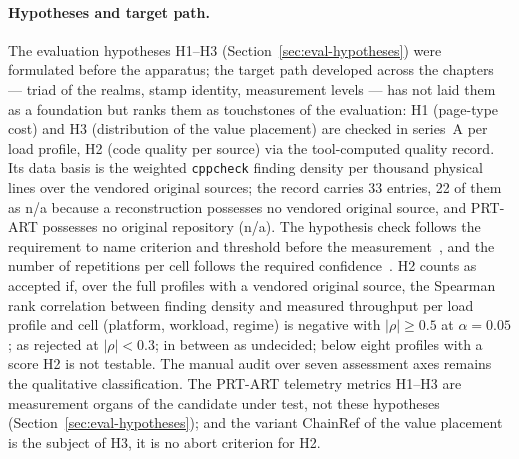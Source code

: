 \begin{nurlang}
\paragraph{Hypotheses and target path.} The evaluation hypotheses H1--H3
(Section~\ref{sec:eval-hypotheses}) were formulated before the apparatus; the target path developed
across the chapters --- triad of the realms, stamp identity, measurement levels --- has not laid
them as a foundation but ranks them as touchstones of the evaluation: H1 (page-type cost) and H3
(distribution of the value placement) are checked in series~A per load profile, H2 (code quality
per source) via the tool-computed quality record. Its data basis is the weighted
\texttt{cppcheck} finding density per thousand physical lines over the vendored original sources;
the record carries 33 entries, 22 of them as n/a because a reconstruction possesses no vendored
original source, and PRT-ART possesses no original repository (n/a). The hypothesis check follows
the requirement to name criterion and threshold before the measurement~\cite{wohlin2012experimentation},
and the number of repetitions per cell follows the required confidence~\cite{kalibera2013rigorous}.
H2 counts as accepted if, over the full profiles with a vendored original source, the Spearman rank
correlation between finding density and measured throughput per load profile and cell (platform,
workload, regime) is negative with $|\rho| \geq 0.5$ at $\alpha = 0.05$; as rejected at
$|\rho| < 0.3$; in between as undecided; below eight profiles with a score H2 is not testable. The
manual audit over seven assessment axes remains the qualitative classification. The PRT-ART
telemetry metrics H1--H3 are measurement organs of the candidate under test, not these hypotheses
(Section~\ref{sec:eval-hypotheses}); and the variant ChainRef of the value placement is the subject
of H3, it is no abort criterion for H2.
\end{nurlang}
